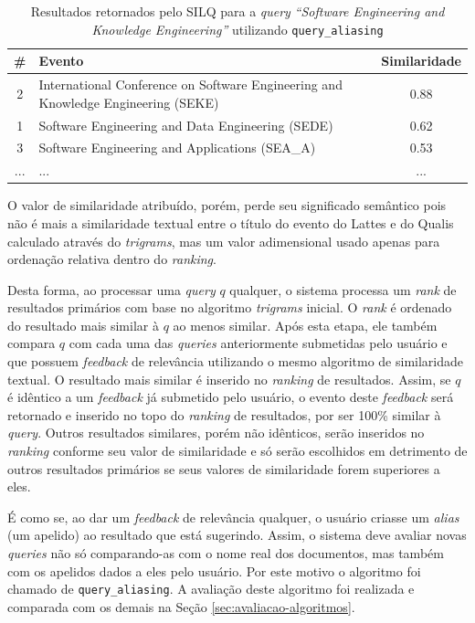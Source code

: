 \documentclass[12pt]{article}
\newcommand{\quotes}[1]{``#1''}
\begin{document}
\begin{table}[!h]
\begin{center}
\caption{Resultados retornados pelo SILQ para a \textit{query} \textit{\quotes{Software Engineering and Knowledge Engineering}} utilizando \texttt{query\_aliasing}} \label{tab:exemplo-qa}
\begin{tabular}{ c | p{7cm} | c }
\hline
\textbf{\#} & \textbf{Evento} & \textbf{Similaridade} \\ \hline
2 & International Conference on Software Engineering and Knowledge Engineering (SEKE) & 0.88 \\ \hline
1 & Software Engineering and Data Engineering (SEDE) & 0.62 \\ \hline
3 & Software Engineering and Applications (SEA\_A) & 0.53 \\ \hline
... & ... & ... \\ \hline
\end{tabular}
\end{center}
\end{table}

O valor de similaridade atribuído, porém, perde seu significado semântico pois não é mais a similaridade textual entre o título do evento do Lattes e do Qualis calculado através do \textit{trigrams}, mas um valor adimensional usado apenas para ordenação relativa dentro do \textit{ranking}.

Desta forma, ao processar uma \textit{query} $q$ qualquer, o sistema processa um \textit{rank} de resultados primários com base no algoritmo \textit{trigrams} inicial. O \textit{rank} é ordenado do resultado mais similar à $q$ ao menos similar. Após esta etapa, ele também compara $q$ com cada uma das \textit{queries} anteriormente submetidas pelo usuário e que possuem \textit{feedback} de relevância utilizando o mesmo algoritmo de similaridade textual. O resultado mais similar é inserido no \textit{ranking} de resultados. Assim, se $q$ é idêntico a um \textit{feedback} já submetido pelo usuário, o evento deste \textit{feedback} será retornado e inserido no topo do \textit{ranking} de resultados, por ser 100\% similar à \textit{query}. Outros resultados similares, porém não idênticos, serão inseridos no \textit{ranking} conforme seu valor de similaridade e só serão escolhidos em detrimento de outros resultados primários se seus valores de similaridade forem superiores a eles.

É como se, ao dar um \textit{feedback} de relevância qualquer, o usuário criasse um \textit{alias} (um apelido) ao resultado que está sugerindo. Assim, o sistema deve avaliar novas \textit{queries} não só comparando-as com o nome real dos documentos, mas também com os apelidos dados a eles pelo usuário. Por este motivo o algoritmo foi chamado de \texttt{query\_aliasing}. A avaliação deste algoritmo foi realizada e comparada com os demais na Seção \ref{sec:avaliacao-algoritmos}.
\end{document}
